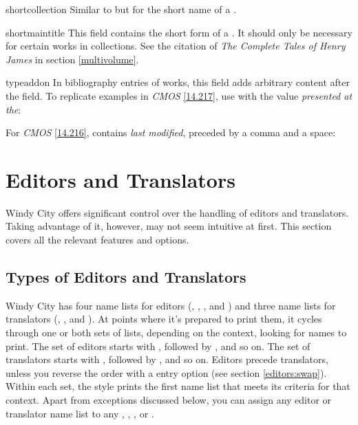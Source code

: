 \documentclass[11pt,letterpaper,oneside]{article}
\begin{document}
\begin{marglist}
\item[shortcollection] Similar to  but for the
short name of a .

\item[shortmaintitle] This field contains the short form of a
. It should only be necessary for certain works in
collections. See the citation of \textit{The Complete Tales of Henry
James} in section \ref{multivolume}.

\item[typeaddon] In bibliography entries of 
works, this field adds arbitrary content after the 
field. To replicate examples in \textit{CMOS} \ref{14.217}, use
 with the value \textit{presented at the}:

\begin{bibonly}
\nocite{hong2015}
\nocite{teplin2005}
\end{bibonly}

\noindent For \textit{CMOS} \ref{14.216}, 
contains \textit{last modified}, preceded by a comma and a space:

\begin{citebib}
\item \cite{balderdash2017}
\end{citebib}

\end{marglist}

\section{Editors and Translators}
\label{editors}

Windy City offers significant control over the handling of editors and
translators. Taking advantage of it, however, may not seem intuitive
at first. This section covers all the relevant features and options.

\subsection{Types of Editors and Translators}

Windy City has four name lists for editors (,
, , and ) and
three name lists for translators (,
, and ). At points where
it's prepared to print them, it cycles through one or both sets of
lists, depending on the context, looking for names to print. The set
of editors starts with , followed by
, and so on. The set of translators starts with
, followed by , and so on.
Editors precede translators, unless you reverse the order with a
 entry option (see section \ref{editors:swap}). Within
each set, the style prints the first name list that meets its criteria
for that context. Apart from exceptions discussed below, you can
assign any editor or translator name list to any ,
, , or .
\end{document}

